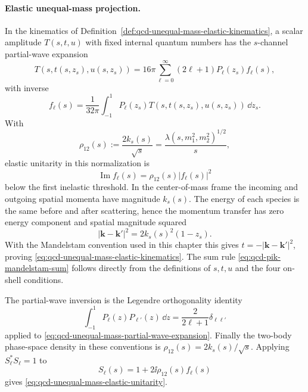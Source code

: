 \paragraph{Elastic unequal-mass projection.}
In the kinematics of
Definition~\ref{def:qcd-unequal-mass-elastic-kinematics}, a scalar
amplitude \(T(s,t,u)\) with fixed internal quantum numbers has the
\(s\)-channel partial-wave expansion
\begin{equation}
  T(s,t(s,z_s),u(s,z_s))
  =
  16\pi
  \sum_{\ell=0}^{\infty}(2\ell+1)P_\ell(z_s)f_\ell(s),
  \label{eq:qcd-unequal-mass-partial-wave-expansion}
\end{equation}
with inverse
\begin{equation}
  f_\ell(s)
  =
  \frac1{32\pi}
  \int_{-1}^{1}P_\ell(z_s)T(s,t(s,z_s),u(s,z_s))\,\dd z_s .
  \label{eq:qcd-unequal-mass-partial-wave-projection}
\end{equation}
With
\[
  \rho_{12}(s):=\frac{2k_s(s)}{\sqrt s}
  =
  \frac{\lambda(s,m_1^2,m_2^2)^{1/2}}{s},
\]
elastic unitarity in this normalization is
\begin{equation}
  \operatorname{Im}f_\ell(s)=\rho_{12}(s)|f_\ell(s)|^2
  \label{eq:qcd-unequal-mass-elastic-unitarity}
\end{equation}
below the first inelastic threshold.
In the center-of-mass frame the incoming and outgoing spatial momenta have
magnitude \(k_s(s)\).  The energy of each species is the same before and
after scattering, hence the momentum transfer has zero energy component and
spatial magnitude squared
\[
  |\mathbf k-\mathbf k'|^2=2k_s(s)^2(1-z_s).
\]
With the Mandelstam convention used in this chapter this gives
\(t=-|\mathbf k-\mathbf k'|^2\), proving
\eqref{eq:qcd-unequal-mass-elastic-kinematics}.  The sum rule
\eqref{eq:qcd-pik-mandelstam-sum} follows directly from the definitions of
\(s,t,u\) and the four on-shell conditions.

The partial-wave inversion is the Legendre orthogonality identity
\[
  \int_{-1}^{1}P_\ell(z)P_{\ell'}(z)\,\dd z
  =
  \frac{2}{2\ell+1}\delta_{\ell\ell'}
\]
applied to \eqref{eq:qcd-unequal-mass-partial-wave-expansion}.  Finally the
two-body phase-space density in these conventions is
\(\rho_{12}(s)=2k_s(s)/\sqrt s\).  Applying \(S_\ell^\ast S_\ell=1\) to
\[
  S_\ell(s)=1+2\ii\rho_{12}(s)f_\ell(s)
\]
gives \eqref{eq:qcd-unequal-mass-elastic-unitarity}.

